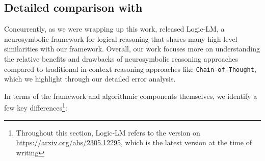 \subsection{Detailed comparison with \citet{pan2023logic}} \label{sec:appendix-logiclm}
Concurrently, as we were wrapping up this work, \citet{pan2023logic} released Logic-LM, a neurosymbolic framework for logical reasoning that shares many high-level similarities with our framework.
Overall, our work focuses more on understanding the relative benefits and drawbacks of neurosymbolic reasoning approaches compared to traditional in-context reasoning approaches like \texttt{Chain-of-Thought}, which we highlight through our detailed error analysis.

In terms of the framework and algorithmic components themselves, we identify a few key differences\footnote{Throughout this section, Logic-LM refers to the version on \url{https://arxiv.org/abs/2305.12295}, which is the latest version at the time of writing}: 
